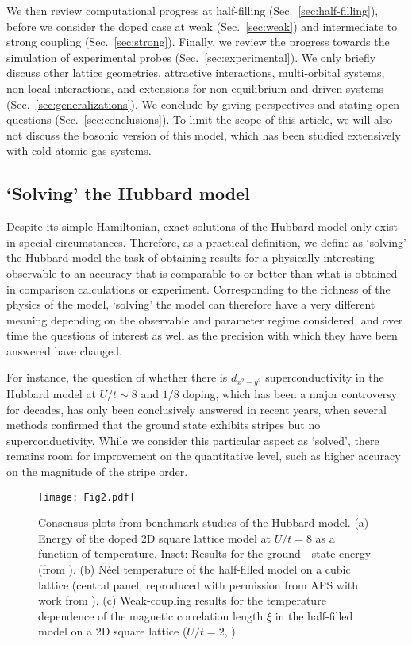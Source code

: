 \documentclass{ar-1col}
\begin{document}
We then review computational progress at half-filling (Sec.~\ref{sec:half-filling}), before we consider the doped case at weak (Sec.~\ref{sec:weak}) and intermediate to strong coupling (Sec.~\ref{sec:strong}). Finally, we review the progress towards the simulation of experimental probes (Sec.~\ref{sec:experimental}). We only briefly discuss other lattice geometries, attractive interactions, multi-orbital systems, non-local interactions, and extensions for non-equilibrium and driven systems (Sec.~\ref{sec:generalizations}). We conclude by giving perspectives and stating open questions (Sec.~\ref{sec:conclusions}).
To limit the scope of this article, we will also not discuss the bosonic version of this model, which has been studied extensively with cold atomic gas systems.

\subsection{`Solving' the Hubbard model}
Despite its simple Hamiltonian,  exact solutions of the Hubbard model only exist in special circumstances. 
Therefore, as a practical definition, we define as `solving' the Hubbard model the task of obtaining results for a physically interesting observable %
to an accuracy that is comparable to or better than what is obtained in comparison calculations or experiment. Corresponding to the richness of the physics of the model, `solving' the model can therefore have a very different meaning depending on the observable and parameter regime considered, and over time the questions of interest as well as the precision with which they have been answered have changed.

For instance, the question of whether there is $d_{x^2-y^2}$ superconductivity in the Hubbard model at $U/t\!\sim\!8$ and $1/8$ doping, which has been a major controversy for decades, has only been conclusively answered in recent years, when several methods confirmed that the ground state exhibits stripes but no superconductivity. While we consider this particular aspect as `solved', there remains room for improvement on the quantitative level, such as higher accuracy on the magnitude of the stripe order. 

 \begin{figure}[t!]
 \texttt{[image: Fig2.pdf]}
   \caption{Consensus plots from benchmark studies of the Hubbard model.
   (a) Energy of the doped 2D square lattice model at $U/t\!=\!8$ as a function of temperature. Inset: Results for the ground - state energy (from \cite{LeBlanc15}). (b) N{\'e}el temperature of the half-filled model on a cubic lattice (central panel, reproduced with permission from APS \cite{Rohringer18} with work from \cite{Dare00,Staudt00,Rohringer11,Kent05,Hirschmeier15,Kozik13}). (c) Weak-coupling results for the temperature dependence of the magnetic correlation length $\xi$ in the half-filled model on a 2D square lattice ($U/t\!=\!2$, \cite{Schaefer21A}).
}
   \label{fig:bench}
 \end{figure}
\end{document}

